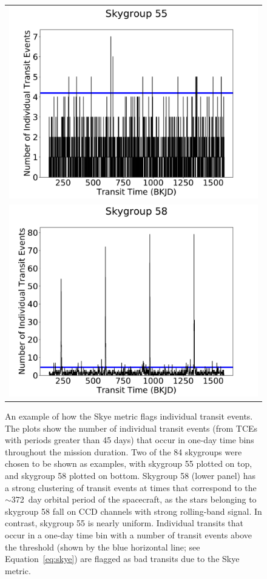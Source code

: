 \begin{figure}[ht]
\centering
\begin{tabular}{c}
\includegraphics[width=\linewidth]{Skye-Paper-Plot-55.pdf}\\
\includegraphics[width=\linewidth]{Skye-Paper-Plot-58.pdf}
\end{tabular}
\caption{An example of how the Skye metric flags individual transit events. The plots show the number of individual transit events (from TCEs with periods greater than 45 days) that occur in one-day time bins throughout the mission duration. Two of the 84 skygroups were chosen to be shown as examples, with skygroup 55 plotted on top, and skygroup 58 plotted on bottom. Skygroup 58 (lower panel) has a strong clustering of transit events at times that correspond to the $\sim$372~day orbital period of the spacecraft, as the stars belonging to skygroup 58 fall on CCD channels with strong rolling-band signal. In contrast, skygroup 55 is nearly uniform. Individual transits that occur in a one-day time bin with a number of transit events above the threshold (shown by the blue horizontal line; see Equation~\ref{eq:skye}) are flagged as bad transits due to the Skye metric.}
\label{skyefig}
\end{figure}


